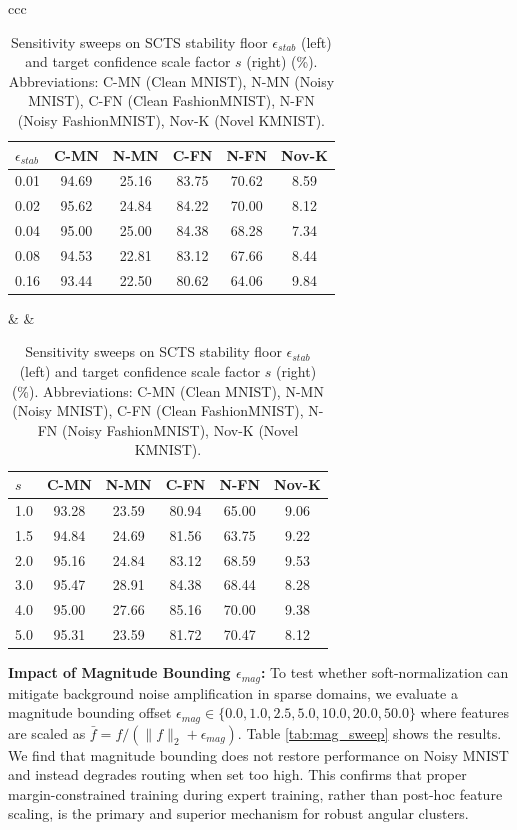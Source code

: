 \documentclass{article}
\theoremstyle{plain}
\theoremstyle{definition}
\theoremstyle{remark}
\begin{document}
\begin{table}[t]
\caption{Sensitivity sweeps on SCTS stability floor $\epsilon_{stab}$ (left) and target confidence scale factor $s$ (right) (\%). Abbreviations: C-MN (Clean MNIST), N-MN (Noisy MNIST), C-FN (Clean FashionMNIST), N-FN (Noisy FashionMNIST), Nov-K (Novel KMNIST).}
\label{tab:sweeps_eps_s}
\vskip 0.1in
\begin{center}
\begin{small}
\begin{sc}
\begin{tabular}{ccc}
\begin{tabular}{lccccc}
\toprule
$\epsilon_{stab}$ & C-MN & N-MN & C-FN & N-FN & Nov-K \\
\midrule
0.01 & 94.69 & 25.16 & 83.75 & 70.62 & 8.59 \\
0.02 & 95.62 & 24.84 & 84.22 & 70.00 & 8.12 \\
0.04 & 95.00 & 25.00 & 84.38 & 68.28 & 7.34 \\
0.08 & 94.53 & 22.81 & 83.12 & 67.66 & 8.44 \\
0.16 & 93.44 & 22.50 & 80.62 & 64.06 & 9.84 \\
\bottomrule
\end{tabular}
& \quad \quad \quad &
\begin{tabular}{lccccc}
\toprule
$s$ & C-MN & N-MN & C-FN & N-FN & Nov-K \\
\midrule
1.0 & 93.28 & 23.59 & 80.94 & 65.00 & 9.06 \\
1.5 & 94.84 & 24.69 & 81.56 & 63.75 & 9.22 \\
2.0 & 95.16 & 24.84 & 83.12 & 68.59 & 9.53 \\
3.0 & 95.47 & 28.91 & 84.38 & 68.44 & 8.28 \\
4.0 & 95.00 & 27.66 & 85.16 & 70.00 & 9.38 \\
5.0 & 95.31 & 23.59 & 81.72 & 70.47 & 8.12 \\
\bottomrule
\end{tabular}
\end{tabular}
\end{sc}
\end{small}
\end{center}
\vskip -0.1in
\end{table}

\textbf{Impact of Magnitude Bounding $\epsilon_{mag}$:} To test whether soft-normalization can mitigate background noise amplification in sparse domains, we evaluate a magnitude bounding offset $\epsilon_{mag} \in \{0.0, 1.0, 2.5, 5.0, 10.0, 20.0, 50.0\}$ where features are scaled as $\bar{f} = f / (\|f\|_2 + \epsilon_{mag})$. Table \ref{tab:mag_sweep} shows the results. We find that magnitude bounding does not restore performance on Noisy MNIST and instead degrades routing when set too high. This confirms that proper margin-constrained training during expert training, rather than post-hoc feature scaling, is the primary and superior mechanism for robust angular clusters.
\end{document}
